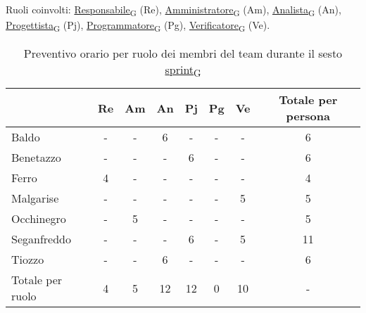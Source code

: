 \newpage
{}
Ruoli coinvolti: \href{https://7last.github.io/docs/rtb/documentazione-interna/glossario\#responsabile}{Responsabile\textsubscript{G}} (Re), \href{https://7last.github.io/docs/rtb/documentazione-interna/glossario\#amministratore}{Amministratore\textsubscript{G}} (Am), \href{https://7last.github.io/docs/rtb/documentazione-interna/glossario\#analista}{Analista\textsubscript{G}} (An), \href{https://7last.github.io/docs/rtb/documentazione-interna/glossario\#progettista}{Progettista\textsubscript{G}} (Pj), \href{https://7last.github.io/docs/rtb/documentazione-interna/glossario\#programmatore}{Programmatore\textsubscript{G}} (Pg), \href{https://7last.github.io/docs/rtb/documentazione-interna/glossario\#verificatore}{Verificatore\textsubscript{G}} (Ve).
\begin{table}[!h]
	\centering
	\begin{tabular}{ | l | c | c | c | c | c | c | c | }
		\hline
		\textbf{} & \textbf{Re} & \textbf{Am} &\textbf{An} & \textbf{Pj} & \textbf{Pg} & \textbf{Ve} & \textbf{Totale per persona} \\
		\hline
		Baldo            &  -   &  -   &  6   &  -   &  -   &  -   &  6   \\
		Benetazzo        &  -   &  -   &  -   &  6   &  -   &  -   &  6   \\
		Ferro            &  4   &  -   &  -   &  -   &  -   &  -   &  4   \\
		Malgarise        &  -   &  -   &  -   &  -   &  -   &  5   &  5   \\
		Occhinegro       &  -   &  5   &  -   &  -   &  -   &  -   &  5   \\
		Seganfreddo      &  -   &  -   &  -   &  6   &  -   &  5   &  11   \\
		Tiozzo           &  -   &  -   &  6   &  -   &  -   &  -   &  6   \\
		\hline
		Totale per ruolo &  4   &  5   &  12   &  12   &  0   &  10   &  -   \\
		\hline
	\end{tabular}
	\caption{Preventivo orario per ruolo dei membri del team durante il sesto \href{https://7last.github.io/docs/rtb/documentazione-interna/glossario\#sprint}{sprint\textsubscript{G}}}

\end{table}


